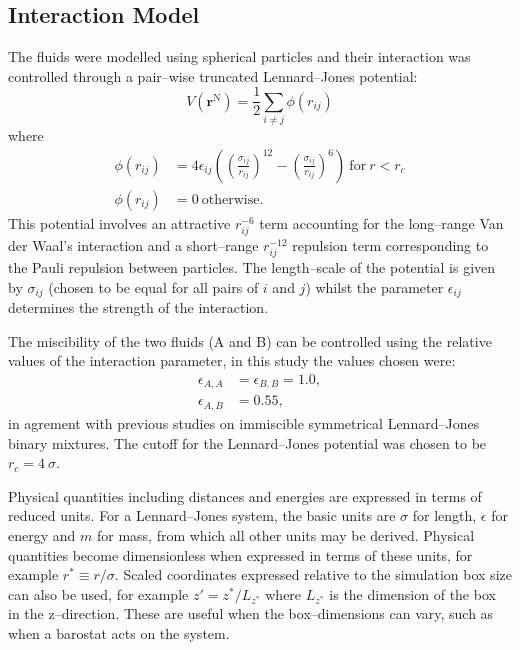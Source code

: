 \subsection{Interaction Model}\label{InteractionModel}
The fluids were modelled using spherical particles and their interaction was controlled through a pair--wise truncated Lennard--Jones potential:
\begin{equation}
V \left( \mathbf{r}^{\mathrm{N}} \right) = \frac{1}{2} \sum_{i\neq j} \phi \left( r_{ij} \right)
\end{equation}
where
\begin{align}
\label{LJ}
\phi \left( r_{ij} \right) &= 4 \epsilon_{ij} \left( \left( \frac{\sigma_{ij}}{r_{ij}}\right)^{12} - \left( \frac{\sigma_{ij}}{r_{ij}}\right)^{6} \right)\ \mathrm{for}\ r < r_{c}\\
\phi \left( r_{ij} \right) &= 0\ \mathrm{otherwise}.
\end{align}
This potential involves an attractive $r_{ij}^{-6}$ term accounting for the long--range Van der Waal's interaction and a short--range $r_{ij}^{-12}$ repulsion term corresponding to the Pauli repulsion between particles.
The length--scale of the potential is given by $\sigma_{ij}$ (chosen to be equal for all pairs of $i$ and $j$) whilst the parameter $\epsilon_{ij}$ determines the strength of the interaction. 

The miscibility of the two fluids (A and B) can be controlled using the relative values of the interaction parameter, in this study the values chosen were:
\begin{align}
\epsilon_{A,A} &= \epsilon_{B,B} = 1.0,\\
\epsilon_{A,B} &= 0.55,
\end{align}
in agrement with previous studies on immiscible symmetrical Lennard--Jones binary mixtures.\cite{MorenzoRazo,Blas,HolgerBoppHampe}
The cutoff for the Lennard--Jones potential was chosen to be $r_{c} = 4\ \sigma$.

Physical quantities including distances and energies are expressed in terms of reduced units.
For a Lennard--Jones system, the basic units are $\sigma$ for length, $\epsilon$ for energy and $m$ for mass, from which all other units may be derived.\cite{FrenkelSmit}
Physical quantities become dimensionless when expressed in terms of these units, for example $r^{*} \equiv r / \sigma$.
Scaled coordinates expressed relative to the simulation box size can also be used, for example $z' = z^{*} / L_{z^{*}}$ where $L_{z^{*}}$ is the dimension of the box in the z--direction.
These are useful when the box--dimensions can vary, such as when a barostat acts on the system.

